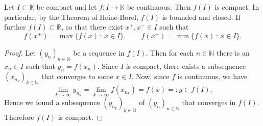 

\begin{Theorem}\label{thm:fctcompact}
Let $I\subset\mathbb{K}$ be compact and let $f:I\to\mathbb{K}$ be continuous. Then $f(I)$ is compact. In particular, by the Theorem of Heine-Borel,
$f(I)$ is bounded and closed. If further $f(I) \subset \mathbb{R}$, so that there exist $x^+,x^-\in I$ such that
\[f(x^+)=\max\{f(x)\,:\,x\in I\},\qquad f(x^-)=\min\{f(x)\,:\,x\in I\}.\]
\end{Theorem}
\begin{proof}
Let $(y_n)_{n\in\mathbb{N}}$ be a sequence in $f(I)$. Then for each $n\in\mathbb{N}$ there is an $x_n\in I$ such that $y_n=f(x_n)$. 
Since $I$ is compact, there exists a subsequence $(x_{n_k})_{k\in\mathbb{N}}$ that converges to some $x\in I$. 
Now, since $f$ is continuous, we have $$\lim_{k\rightarrow \infty} y_{n_k} = \lim_{k\rightarrow \infty} f(x_{n_k}) = f(x)=:y \in f(I).$$
Hence we found a subsequence $(y_{n_k})_{k\in\mathbb{N}}$ of $(y_n)_{n\in\mathbb{N}}$ that converges in $f(I)$. Therefore $f(I)$ is compact.
\end{proof}


